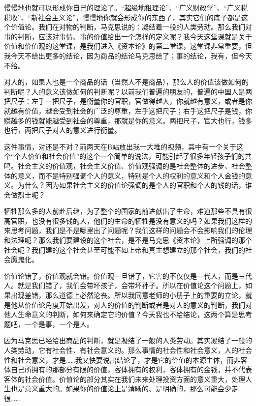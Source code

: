 \documentclass[UTF8, 12pt, a4paper]{ctexrep}
\begin{document}
慢慢地也就可以形成你自己的理论了。“超级地租理论”、“广义财政学”、“广义税税收”、“新社会主义论”，慢慢地你就会形成你的东西了，其实它们的底子都是这个价值论。我们在对物的判断，马克思说的：凝结着一般的人类劳动。那么我们对事的判断，应该对事情、事的价值给出一个怎样的定义呢？我今天这堂课就是关于价值和价值观的这堂课，是我们进入《资本论》的第二堂课，这堂课非常重要，但我今天不给出更多的结论，因为商品的结论马克思给了；事的结论，我有，但今天不给。

对人的，如果人也是一个商品的话（当然人不是商品），那么人的价值该做如何的判断呢？人的意义该做如何的判断呢？以前我们普遍的朋友的，普遍的中国人是两把尺子：左手一把尺子，是衡量你的官职，官做得越大，你就越有意义，或者是你就越有价值，越会受到社会的广泛的尊重，左手这把尺子；右手这把尺子是钱，你赚越多的钱就能越受到社会的尊重，那就是你的意义。两把尺子，官大也行，钱多也行，两把尺子对人的意义进行衡量。

这件事情，对还是不对？前两天在B站放出我一大堆的视频，其中有一个关于这个“个人价值和社会价值”的这个一个简单的说法，可能引起了很多年轻孩子们的共鸣。社会主义的价值观，社会主义价值、价值观强调的是社会整体的进步、社会整体的意义，而不是特别强调个人的意义，特别是个人的权利的意义和个人金钱的意义。为什么？因为如果社会主义的价值论强调的是个人的官职和个人的钱的话，谁会做烈士呢？

牺牲那么多的人前赴后继，为了整个的国家的前进献出了生命，难道那些不具有很高官职，也没有很多钱的人，他们的生命的牺牲是没有意义的吗？如果我们这样的来思考问题，我们是不是哪里出了问题呢？我们这样的问题会不会影响我们的伦理和法理呢？那么我们要建设的这个社会，是不是马克思《资本论》上所强调的那个社会呢？我们建的这个社会甚至可能不如上帝和真主想建立的那个社会，我们的社会魔鬼化。

价值论错了，价值观就会错。价值观一旦错了，它害的不仅仅是一代人，而是三代人。就是我们错了，我们会带坏孩子，会带坏孙子。所以在价值论这个问题上，如果出现差错，那么道德上必然沦丧。所以我同意老师的小册子上的重要的立论，就是他从价值论角度开始出发，对人的价值的判断或者是对人的意义的判断，我们对他人生命意义的判断，如何来确定它的价值？今天我也不给结论，这两个算是思考题吧，一个是事，一个是人。

因为马克思已经给出商品的判断，就是凝结了一般的人类劳动。其实凝结了一般的人类劳动，它有社会性、有社会意义的。那么事情的社会性和社会意义，人的社会性和社会意义，才是……我又快要说出结论了，才是它的价值的本源主体，而非客体自己所拥有的那部分有限的价值，客体拥有的权利，客体拥有的金钱，并不代表客体的社会价值。价值论的部分其实在我们未来处理投资方面的意义重大，处理人生也是意义重大的。如果你的价值论上是清晰的、是明确的，那么可能会少走很……
\end{document}

